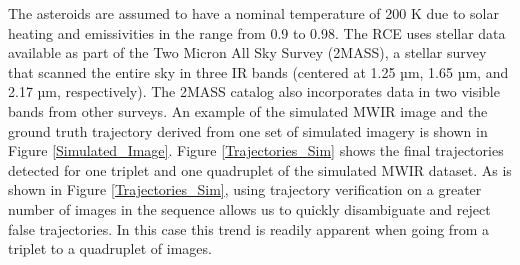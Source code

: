  The asteroids are assumed to have a nominal temperature of 200 K due to solar heating and emissivities in the range from 0.9 to 0.98. 
 The RCE uses stellar data available as part of the Two Micron All Sky Survey (2MASS), a stellar survey that scanned the entire sky in three IR bands (centered at 1.25 µm, 1.65 µm, and 2.17 µm, respectively).  The 2MASS catalog also incorporates data in two visible bands from other surveys. 
 An example of the simulated MWIR image and the ground truth trajectory derived from one set of simulated imagery is shown in Figure \ref{Simulated_Image}. 
 Figure \ref{Trajectories_Sim} shows the final trajectories detected for one triplet and one quadruplet of the simulated MWIR dataset. As is shown in Figure \ref{Trajectories_Sim}, using trajectory verification on a greater number of images in the sequence allows us to quickly disambiguate and reject false trajectories. In this case this trend is readily apparent when going from a triplet to a quadruplet of images.
%
%
